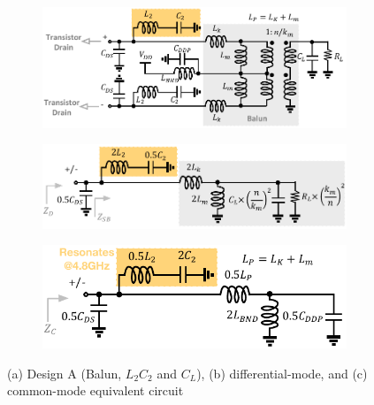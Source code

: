 \documentclass[conference]{IEEEtran}
\begin{document}
\begin{figure}[!t]
\captionsetup{font=footnotesize}
\centering
\begin{subfigure}{0.5\textwidth}
\centering
\includegraphics[width=1\textwidth]{Images/Design/Design_A_FC.pdf}
\caption{}
\label{fig:Design_A_FC}
\end{subfigure}
\begin{subfigure}[b]{0.35\textwidth}
\includegraphics[width=1\textwidth]{Images/Design/Design_A_Diff.pdf}
\caption{}
\label{fig:Design_A_Diff}
\end{subfigure}
\begin{subfigure}[b]{0.35\textwidth}
\includegraphics[width=1\textwidth]{Images/Design/Design_A_Com.pdf}
\caption{}
\label{fig:Design_A_Com}
\end{subfigure}
\caption{(a) Design A (Balun, $L_2C_2$ and $C_L$), (b) differential-mode, and (c) common-mode equivalent circuit }
\label{fig:Design_A}
\vspace{-0.2in}
\end{figure}
\end{document}

